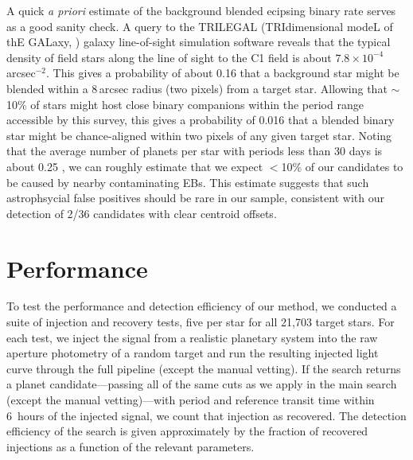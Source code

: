 \documentclass[12pt,preprint]{aastex}
\newcommand{\sectlabel}[1]{\label{sect:#1}}
\begin{document}
A quick \emph{a priori} estimate of the background blended ecipsing
binary rate serves as a good sanity check.  A query to the TRILEGAL
(TRIdimensional modeL of thE GALaxy, \citet{Girardi:2005}) galaxy
line-of-sight simulation software reveals that the typical density of
field stars along the line of sight to the C1 field is about
$7.8\times 10^{-4}$\,arcsec$^{-2}$.  This gives a probability of about
0.16 that a background star might be blended within a 8\,arcsec radius
(two pixels) from a target star.  Allowing that $\sim$10\% of stars
might host close binary companions within the period range accessible
by this survey, this gives a probability of 0.016 that a blended
binary star might be chance-aligned within two pixels of any given
target star.  Noting that the average number of planets per star with
periods less than 30 days is about 0.25 \citep{Fressin:2013}, we can
roughly estimate that we expect $<$10\% of our candidates to be caused
by nearby contaminating EBs.  This estimate suggests that such
astrophsycial false positives should be rare in our sample, consistent
with our detection of 2/36 candidates with clear centroid offsets.


\section{Performance}
\sectlabel{perform}

To test the performance and detection efficiency of our method, we conducted a
suite of injection and recovery tests, five per
star for all 21,703 target stars.
For each test, we inject the signal from a realistic planetary system into the
raw aperture photometry of a random target and run the resulting injected
light curve through the full pipeline (except the manual vetting).
If the search returns a planet candidate---passing all of the same cuts as we
apply in the main search (except the manual vetting)---with period and
reference transit time within 6~hours of the injected signal, we count that
injection as recovered.
The detection efficiency of the search is given approximately by the fraction
of recovered injections as a function of the relevant parameters.
\end{document}
